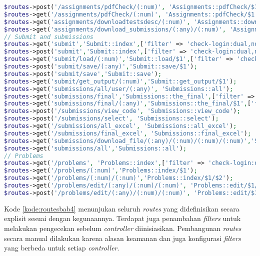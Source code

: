 \begin{lstlisting}[language=PHP, caption=Penambahan \textit{routes} yang digunakan pada aplikasi \textit{SharIF Judge}, label=kode:routesbab4]
$routes->post('/assignments/pdfCheck/(:num)', 'Assignments::pdfCheck/$1');
$routes->get('/assignments/pdfCheck/(:num)', 'Assignments::pdfCheck/$1');
$routes->get('assignments/downloadtestsdesc/(:num)', 'Assignments::downloadtestsdesc/$1');
$routes->get('assignments/download_submissions/(:any)/(:num)', 'Assignments::download_submissions/$1/$2');
// Submit and submissions
$routes->get('submit','Submit::index',['filter' => 'check-login:dual,noreturn']);
$routes->post('submit','Submit::index',['filter' => 'check-login:dual,noreturn']);
$routes->get('submit/load/(:num)','Submit::load/$1',['filter' => 'check-login:dual,noreturn']);
$routes->post('submit/save/(:any)','Submit::save/$1');
$routes->post('submit/save','Submit::save');
$routes->get('submit/get_output/(:num)','Submit::get_output/$1');
$routes->get('submissions/all/user/(:any)', 'Submissions::all');
$routes->get('submissions/final','Submissions::the_final',['filter' => 'check-login:dual,noreturn']);
$routes->get('submissions/final/(:any)','Submissions::the_final/$1',['filter' => 'check-login:dual,noreturn']);
$routes->post('/submissions/view_code', 'Submissions::view_code');
$routes->post('/submissions/select', 'Submissions::select');
$routes->get('/submissions/all_excel', 'Submissions::all_excel');
$routes->get('/submissions/final_excel', 'Submissions::final_excel');
$routes->get('submissions/download_file/(:any)/(:num)/(:num)/(:num)','Submissions::download_file/$1/$2/$3/$4');
$routes->get('submissions/all','Submissions::all');
// Problems
$routes->get('/problems', 'Problems::index',['filter' => 'check-login:dual,noreturn']);
$routes->get('/problems/(:num)','Problems::index/$1');
$routes->get('/problems/(:num)/(:num)','Problems::index/$1/$2');
$routes->get('/problems/edit/(:any)/(:num)/(:num)', 'Problems::edit/$1/$2/$3');
$routes->post('/problems/edit/(:any)/(:num)/(:num)', 'Problems::edit/$1/$2/$3');
\end{lstlisting}
Kode \ref{kode:routesbab4} menunjukan seluruh \textit{routes} yang didefinisikan secara explisit sesuai dengan kegunaannya. Terdapat juga penambahan \textit{filters} untuk melakukan pengecekan sebelum \textit{controller} diinisiasikan. Pembangunan \textit{routes} secara manual dilakukan karena alasan keamanan dan juga konfigurasi \textit{filters} yang berbeda untuk setiap \textit{controller}.

